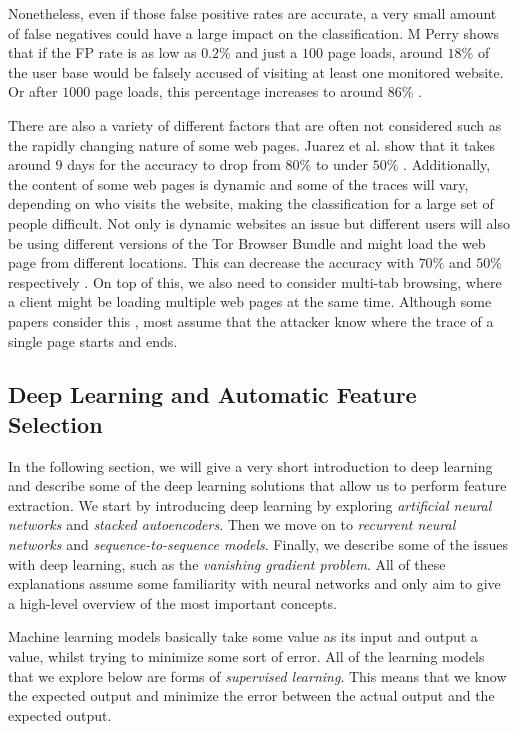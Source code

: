 Nonetheless, even if those false positive rates are accurate, a very small amount of false negatives could have a large impact on the classification.
M Perry shows that if the FP rate is as low as $0.2\%$ and just a $100$ page loads, around $18\%$ of the user base would be falsely accused of visiting at least one monitored website.
Or after $1000$ page loads, this percentage increases to around $86\%$ \cite{wfpcritique}.

There are also a variety of different factors that are often not considered such as the rapidly changing nature of some web pages.
Juarez et al. show that it takes around $9$ days for the accuracy to drop from $80\%$ to under $50\%$ \cite{wfpevaluation}.
Additionally, the content of some web pages is dynamic and some of the traces will vary, depending on who visits the website, making the classification for a large set of people difficult.
Not only is dynamic websites an issue but different users will also be using different versions of the Tor Browser Bundle and might load the web page from different locations.
This can decrease the accuracy with $70\%$ and $50\%$ respectively \cite{wfpevaluation}.
On top of this, we also need to consider multi-tab browsing, where a client might be loading multiple web pages at the same time.
Although some papers consider this \cite{naivebayes}, most assume that the attacker know where the trace of a single page starts and ends.

\subsection{Deep Learning and Automatic Feature Selection}

In the following section, we will give a very short introduction to deep learning and describe some of the deep learning solutions that allow us to perform feature extraction.
We start by introducing deep learning by exploring \textit{artificial neural networks} and \textit{stacked autoencoders}.
Then we move on to \textit{recurrent neural networks} and \textit{sequence-to-sequence models}.
Finally, we describe some of the issues with deep learning, such as the \textit{vanishing gradient problem}.
All of these explanations assume some familiarity with neural networks and only aim to give a high-level overview of the most important concepts.

Machine learning models basically take some value as its input and output a value, whilst trying to minimize some sort of error.
All of the learning models that we explore below are forms of \textit{supervised learning}.
This means that we know the expected output and minimize the error between the actual output and the expected output.

